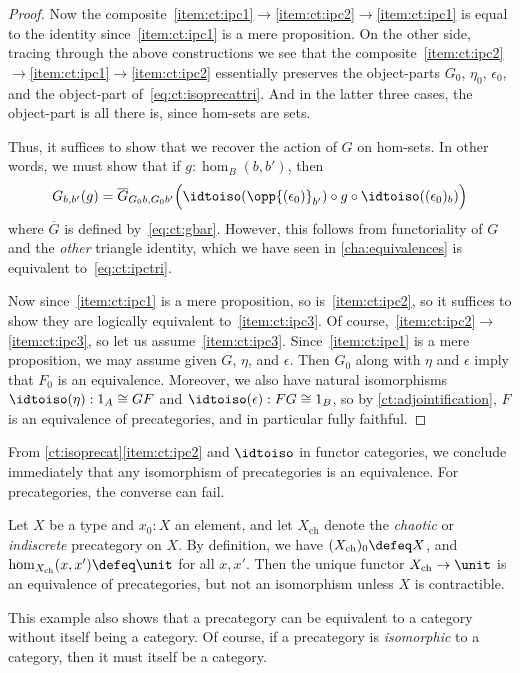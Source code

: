 \begin{proof}
  Now the composite~\ref{item:ct:ipc1}$\to$\ref{item:ct:ipc2}$\to$\ref{item:ct:ipc1} is equal to the identity since~\ref{item:ct:ipc1} is a mere proposition.
  On the other side, tracing through the above constructions we see that the composite~\ref{item:ct:ipc2}$\to$\ref{item:ct:ipc1}$\to$\ref{item:ct:ipc2} essentially preserves the object-parts $G_0$, $\eta_0$, $\epsilon_0$, and the object-part of~\eqref{eq:ct:isoprecattri}.
  And in the latter three cases, the object-part is all there is, since hom-sets are sets.

  Thus, it suffices to show that we recover the action of $G$ on hom-sets.
  In other words, we must show that if $g:\hom_B(b,b')$, then
  \[ G_{b,b'}(g) =
  \overline{G}_{G_0b,G_0b'}\Big(\idtoiso(\opp{(\epsilon_0)}_{b'}) \circ g \circ \idtoiso((\epsilon_0)_b)\Big)
  \]
  where $\overline{G}$ is defined by~\eqref{eq:ct:gbar}.
  However, this follows from functoriality of $G$ and the \emph{other} triangle identity, which we have seen in \cref{cha:equivalences} is equivalent to~\eqref{eq:ct:ipctri}.

  Now since~\ref{item:ct:ipc1} is a mere proposition, so is~\ref{item:ct:ipc2}, so it suffices to show they are logically equivalent to~\ref{item:ct:ipc3}.
  Of course,~\ref{item:ct:ipc2}$\to$\ref{item:ct:ipc3}, so let us assume~\ref{item:ct:ipc3}.
  Since~\ref{item:ct:ipc1} is a mere proposition, we may assume given $G$, $\eta$, and $\epsilon$.
  Then $G_0$ along with $\eta$ and $\epsilon$ imply that $F_0$ is an equivalence.
  Moreover, we also have natural isomorphisms $\idtoiso(\eta):1_A\cong GF$ and $\idtoiso(\epsilon):FG\cong 1_B$, so by \cref{ct:adjointification}, $F$ is an equivalence of precategories, and in particular fully faithful.
\end{proof}

From \cref{ct:isoprecat}\ref{item:ct:ipc2} and $\idtoiso$ in functor categories, we conclude immediately that any isomorphism of precategories is an equivalence.
For precategories, the converse can fail.

\begin{eg}\label{ct:chaotic}
  Let $X$ be a type and $x_0:X$ an element, and let $X_{\mathrm{ch}}$ denote the \emph{chaotic} or \emph{indiscrete} precategory on $X$.
  By definition, we have $(X_{\mathrm{ch}})_0\defeq X$, and $\hom_{X_{\mathrm{ch}}}(x,x') \defeq \unit$ for all $x,x'$.
  Then the unique functor $X_{\mathrm{ch}}\to \unit$ is an equivalence of precategories, but not an isomorphism unless $X$ is contractible.

  This example also shows that a precategory can be equivalent to a category without itself being a category.
  Of course, if a precategory is \emph{isomorphic} to a category, then it must itself be a category.
\end{eg}


